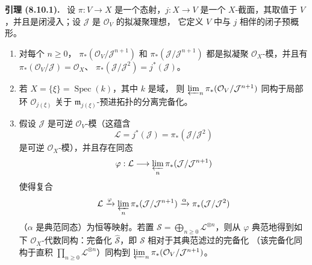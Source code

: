 \documentclass[UTF8,fontset=none,11pt,oneside,openany]{ctexbook}
\newenvironment{lemma}[1][]{\par\medskip\noindent\textbf{引理 (#1).}\ }{\par}
\let\EGAOriginalLabel\label
\renewcommand{\label}[1]{\phantomsection\EGAOriginalLabel{#1}}
\begin{document}
\begin{lemma}[8.10.1]
\label{II.8.10.1-zh}
设 $\pi:V\to X$ 是一个态射，$j:X\to V$ 是一个 $X$-截面，其取值于
$V$，并且是闭浸入；设 $\mathcal{J}$ 是 $\mathcal{O}_V$ 的拟凝聚理想，
它定义 $V$ 中与 $j$ 相伴的闭子预概形。
\begin{enumerate}
  \item[\rm{(i)}] 对每个 $n\geqslant 0$，
  $\pi_*(\mathcal{O}_V/\mathcal{J}^{n+1})$ 和
  $\pi_*(\mathcal{J}/\mathcal{J}^{n+1})$ 都是拟凝聚
  $\mathcal{O}_X$-模，并且有
  $\pi_*(\mathcal{O}_V/\mathcal{J})=\mathcal{O}_X$、
  $\pi_*(\mathcal{J}/\mathcal{J}^2)=j^*(\mathcal{J})$。
  \item[\rm{(ii)}] 若 $X=\{\xi\}=\operatorname{Spec}(k)$，其中 $k$ 是域，
  则 $\varprojlim_n\pi_*(\mathcal{O}_V/\mathcal{J}^{n+1})$ 同构于局部环
  $\mathcal{O}_{j(\xi)}$ 关于 $\mathfrak{m}_{j(\xi)}$-预进拓扑的分离完备化。
  \item[\rm{(iii)}] 假设 $\mathcal{J}$ 是可逆
  $\mathcal{O}_V$-模（这蕴含
  \[
    \mathcal{L}=j^*(\mathcal{J})=
    \pi_*(\mathcal{J}/\mathcal{J}^2)
  \]
  是可逆 $\mathcal{O}_X$-模），并且存在同态
  \[
    \varphi:\mathcal{L}\longrightarrow
    \varprojlim_n\pi_*(\mathcal{J}/\mathcal{J}^{n+1})
  \]
  使得复合
  \[
    \mathcal{L}\xrightarrow{\varphi}
    \varprojlim_n\pi_*(\mathcal{J}/\mathcal{J}^{n+1})
    \xrightarrow{\alpha}\pi_*(\mathcal{J}/\mathcal{J}^2)
  \]
  （$\alpha$ 是典范同态）为恒等映射。若置
  $\mathcal{S}=\bigoplus_{n\geqslant0}\mathcal{L}^{\otimes n}$，则从
  $\varphi$ 典范地得到如下 $\mathcal{O}_X$-代数同构：完备化
  $\widehat{\mathcal{S}}$，即 $\mathcal{S}$ 相对于其典范滤过的完备化
  （该完备化同构于直积
  $\prod_{n\geqslant0}\mathcal{L}^{\otimes n}$）同构到
  $\varprojlim_n\pi_*(\mathcal{O}_V/\mathcal{J}^{n+1})$。
\end{enumerate}
\end{lemma}
\end{document}
